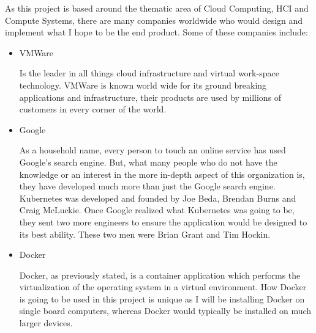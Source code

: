 As this project is based around the thematic area of Cloud Computing, HCI and Compute Systems, there are many companies worldwide who would design and implement what I hope to be the end product. Some of these companies include:

\begin{itemize}
    \item VMWare
    
    Is the leader in all things cloud infrastructure and virtual work-space technology. VMWare is known world wide for its ground breaking applications and infrastructure, their products are used by millions of customers in every corner of the world. 
    
    \item Google
    
    As a household name, every person to touch an online service has used Google's search engine. But, what many people who do not have the knowledge or an interest in the more in-depth aspect of this organization is, they have developed much more than just the Google search engine. Kubernetes was developed and founded by Joe Beda, Brendan Burns and Craig McLuckie. Once Google realized what Kubernetes was going to be, they sent two more engineers to ensure the application would be designed to its best ability. These two men were Brian Grant and Tim Hockin.
    
    \item Docker 
    
    Docker, as previously stated, is a container application which performs the virtualization of the operating system in a virtual environment. How Docker is going to be used in this project is unique as I will be installing Docker on single board computers, whereas Docker would typically be installed on much larger devices. 
    
\end{itemize}

